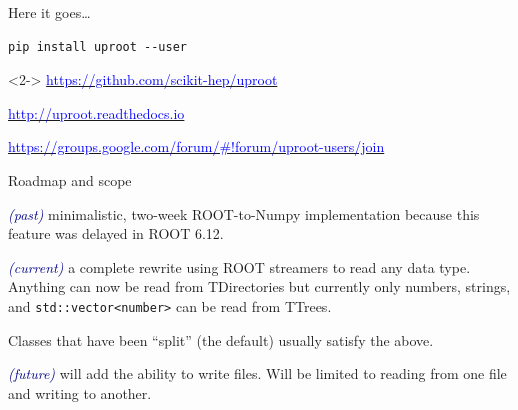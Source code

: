 \documentclass[aspectratio=169]{beamer}
\begin{document}
\begin{frame}[fragile]{Here it goes\ldots}
\vspace{0.5 cm}
\huge
\begin{center}
\begin{minipage}{0.8\linewidth}
\begin{verbatim}
pip install uproot --user
\end{verbatim}
\end{minipage}

\Large
\begin{uncoverenv}<2->
\vspace{1 cm}
\href{https://github.com/scikit-hep/uproot}{\textcolor{blue}{https://github.com/scikit-hep/uproot}}

\vspace{0.5 cm}
\href{http://uproot.readthedocs.io}{\textcolor{blue}{http://uproot.readthedocs.io}}

\vspace{0.5 cm}
\href{https://groups.google.com/forum/#!forum/uproot-users/join}{\textcolor{blue}{https://groups.google.com/forum/\#!forum/uproot-users/join}}
\end{uncoverenv}
\end{center}
\end{frame}

\begin{frame}{Roadmap and scope}
\vspace{0.5 cm}
\large
\begin{description}\setlength{\itemsep}{0.5 cm}
\item[version 1.x] \textcolor{darkblue}{\it (past)} minimalistic, two-week ROOT-to-Numpy implementation because this feature was delayed in ROOT 6.12.

\item[version 2.x] \textcolor{darkblue}{\it (current)} a complete rewrite using ROOT streamers to read any data type. Anything can now be read from TDirectories but currently only numbers, strings, and {\tt std::vector<number>} can be read from TTrees.

\vspace{0.5 cm}
Classes that have been ``split'' (the default) usually satisfy the above.

\item[version 3.x] \textcolor{darkblue}{\it (future)} will add the ability to write files. Will be limited to reading from one file and writing to another.
\end{description}
\end{frame}
\end{document}
